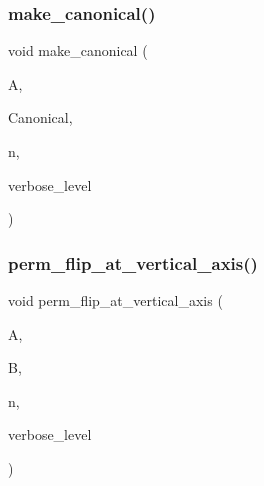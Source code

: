 \mbox{\label{costas_8_c_aefe15889a05bc0c7121bbf6b30e7917d}} 
\subsubsection{\texorpdfstring{make\+\_\+canonical()}{make\_canonical()}}
{\footnotesize\ttfamily void make\+\_\+canonical (\begin{DoxyParamCaption}\item[{\mbox{\hyperlink{galois_8h_a09fddde158a3a20bd2dcadb609de11dc}{I\+NT}} $\ast$}]{A,  }\item[{\mbox{\hyperlink{galois_8h_a09fddde158a3a20bd2dcadb609de11dc}{I\+NT}} $\ast$}]{Canonical,  }\item[{\mbox{\hyperlink{galois_8h_a09fddde158a3a20bd2dcadb609de11dc}{I\+NT}}}]{n,  }\item[{\mbox{\hyperlink{galois_8h_a09fddde158a3a20bd2dcadb609de11dc}{I\+NT}}}]{verbose\+\_\+level }\end{DoxyParamCaption})}

\mbox{\label{costas_8_c_aba51fd6a02cb25246a19ad82943a1e28}} 
\subsubsection{\texorpdfstring{perm\+\_\+flip\+\_\+at\+\_\+vertical\+\_\+axis()}{perm\_flip\_at\_vertical\_axis()}}
{\footnotesize\ttfamily void perm\+\_\+flip\+\_\+at\+\_\+vertical\+\_\+axis (\begin{DoxyParamCaption}\item[{\mbox{\hyperlink{galois_8h_a09fddde158a3a20bd2dcadb609de11dc}{I\+NT}} $\ast$}]{A,  }\item[{\mbox{\hyperlink{galois_8h_a09fddde158a3a20bd2dcadb609de11dc}{I\+NT}} $\ast$}]{B,  }\item[{\mbox{\hyperlink{galois_8h_a09fddde158a3a20bd2dcadb609de11dc}{I\+NT}}}]{n,  }\item[{\mbox{\hyperlink{galois_8h_a09fddde158a3a20bd2dcadb609de11dc}{I\+NT}}}]{verbose\+\_\+level }\end{DoxyParamCaption})}

